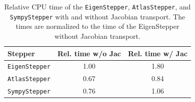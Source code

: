 \begin{table}[ht]
    \centering
    \begin{tabular}{lcc}
        \hline
        \textbf{Stepper} & \textbf{Rel. time w/o Jac} & \textbf{Rel. time w/ Jac} \\
        \hline
        \texttt{EigenStepper} & 1.00 & 1.80 \\
        \texttt{AtlasStepper} & 0.67 & 0.84 \\
        \texttt{SympyStepper} & 0.76 & 1.06 \\
        \hline
    \end{tabular}
    \caption{Relative CPU time of the \texttt{EigenStepper}, \texttt{AtlasStepper}, and \texttt{SympyStepper} with and without Jacobian transport. The times are normalized to the time of the EigenStepper without Jacobian transport.}
    \label{tab:dev/stepper/sympy-perf}
\end{table}
